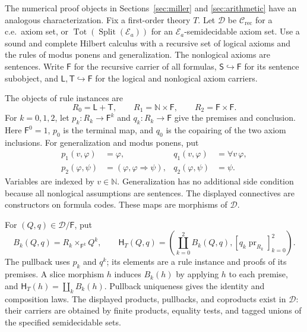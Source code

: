 \documentclass[11pt]{article}
\newcommand{\N}{\mathbb N}
\begin{document}
The numerical proof objects in Sections~\ref{sec:miller} and
\ref{sec:arithmetic} have an analogous characterization.
Fix a first-order theory $T$. Let
$\mathcal D$ be $\mathcal C_{\mathrm{rec}}$ for a c.e.\ axiom set,
or $\operatorname{Tot}(\operatorname{Split}(\mathcal E_a))$ for an
$\mathcal E_a$-semidecidable axiom set. Use a sound and complete
Hilbert calculus with a recursive set of logical axioms and the rules
of modus ponens and generalization. The nonlogical axioms are sentences.
Write $\mathsf F$ for the recursive carrier of all formulas,
$\mathsf S\hookrightarrow\mathsf F$ for its sentence subobject, and
$\mathsf L,\mathsf T\hookrightarrow\mathsf F$ for the logical and
nonlogical axiom carriers.

The objects of rule instances are
\[
 R_0=\mathsf L+\mathsf T,\qquad
 R_1=\N\times\mathsf F,\qquad R_2=\mathsf F\times\mathsf F.
\]
For $k=0,1,2$, let $p_k:R_k\to\mathsf F^k$ and
$q_k:R_k\to\mathsf F$ give the premises and conclusion. Here
$\mathsf F^0=1$, $p_0$ is the terminal map, and $q_0$ is the copairing
of the two axiom inclusions. For generalization and modus ponens, put
\[
\begin{aligned}
 p_1(v,\varphi)&=\varphi,&
 q_1(v,\varphi)&=\forall v\,\varphi,\\
 p_2(\varphi,\psi)&=(\varphi,\varphi\Rightarrow\psi),&
 q_2(\varphi,\psi)&=\psi.
\end{aligned}
\]
Variables are indexed by $v\in\N$. Generalization has no additional
side condition because all nonlogical assumptions are sentences.
The displayed connectives are constructors on formula codes.
These maps are morphisms of $\mathcal D$.

For $(Q,q)\in\mathcal D/\mathsf F$, put
\[
 B_k(Q,q)=R_k\times_{\mathsf F^k}Q^k,
 \qquad
 \mathsf H_T(Q,q)=
 \left(\coprod_{k=0}^2 B_k(Q,q),
       [q_k\operatorname{pr}_{R_k}]_{k=0}^2\right).
\]
The pullback uses $p_k$ and $q^k$; its elements are a rule instance
and proofs of its premises. A slice morphism $h$ induces
$B_k(h)$ by applying $h$ to each premise, and
$\mathsf H_T(h)=\coprod_k B_k(h)$.
Pullback uniqueness gives the identity and composition laws.
The displayed products, pullbacks, and coproducts exist in
$\mathcal D$: their carriers are obtained by finite products,
equality tests, and tagged unions of the specified semidecidable sets.
\end{document}
